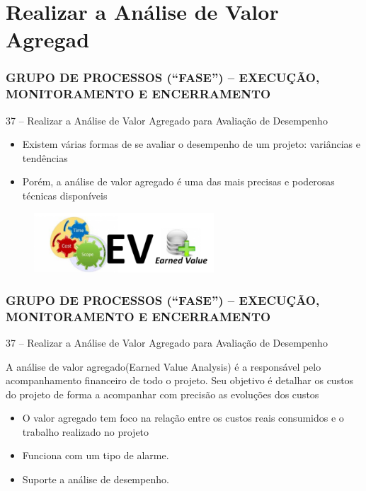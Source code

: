 \section{Realizar a Análise de Valor Agregad}
\begin{frame}
 \frametitle{GRUPO DE PROCESSOS (“FASE”) – \small{EXECUÇÃO, MONITORAMENTO E ENCERRAMENTO}}
 37 – Realizar a Análise de Valor Agregado para Avaliação de Desempenho
\begin{itemize}
 \item Existem várias formas de se avaliar o desempenho de um projeto: variâncias e tendências
  \item Porém, a análise de valor agregado é uma das mais precisas e poderosas técnicas disponíveis
 \end{itemize}
   \begin{figure}
   \centering
   \includegraphics[width = 0.6\textwidth]{figs/fig5.png}
  \end{figure}
\end{frame}

\begin{frame}
 \frametitle{GRUPO DE PROCESSOS (“FASE”) – \small{EXECUÇÃO, MONITORAMENTO E ENCERRAMENTO}}
 37 – Realizar a Análise de Valor Agregado para Avaliação de Desempenho
 \begin{block}{}
  A análise de valor agregado(Earned Value Analysis) é a responsável pelo acompanhamento financeiro de todo o  projeto. Seu objetivo é detalhar os custos do projeto de 
  forma a acompanhar com precisão as evoluções dos custos
 \end{block}
\begin{itemize}
 \item O valor agregado tem foco na relação entre os custos reais consumidos e o trabalho realizado no projeto
  \item Funciona com um tipo de alarme.
  \item Suporte a análise de desempenho.
 \end{itemize}
 \end{frame}
 
